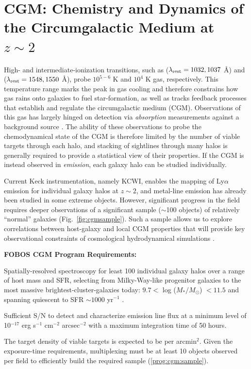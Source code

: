 \documentclass[11pt,a4paper,twoside,onecolumn,openany,final,oldfontcommands]{memoir}
\begin{document}


\section{CGM: Chemistry and Dynamics of the Circumgalactic Medium at $z\sim2$}

High- and intermediate-ionization transitions, such as  ($\lambda_{\rm rest} = 1032, 1037$ \AA) and  ($\lambda_{\rm rest} = 1548, 1550$ \AA), probe $10^{5-6}$ K and $10^4$ K gas, respectively.  This temperature range marks the peak in gas cooling and therefore constrains how gas rains onto galaxies to fuel star-formation, as well as tracks feedback processes that establish and regulate the circumgalactic medium (CGM).  Observations of this gas has largely hinged on detection via \textit{absorption} measurements against a background source .  The ability of these observations to probe the chemodynamical state of the CGM is therefore limited by the number of viable targets through each halo, and stacking of sightlines through many halos is generally required to provide a statistical view of their properties.  If the CGM is instead observed in \textit{emission}, each galaxy halo can be studied individually.

Current Keck instrumentation, namely KCWI, enables the mapping of Ly$\alpha$ emission for individual galaxy halos at $z\sim2$, and metal-line emission has already been studied in some extreme objects. However, significant progress in the field requires deeper observations of a significant sample ($\sim$100 objects) of relatively ``normal'' galaxies (Fig.~\ref{fig:cgmsample}).  Such a sample allows us to explore correlations between host-galaxy and local CGM properties that will provide key observational constraints of cosmological hydrodynamical simulations .


\noindent \textbf{FOBOS CGM Program Requirements:}

\begin{programrequirement}
\reqitem Spatially-resolved spectroscopy for least 100 individual galaxy halos over a range of host mass and SFR, selecting from Milky-Way-like progenitor galaxies to the most massive brightest-cluster-galaxies today: $9.7 <$ log ($M_*/M_\odot$) $< 11.5$ and spanning quiescent to SFR $\sim 1000$ yr$^{-1}$ . \label{prog:cgm:sample}

\reqitem Sufficient S/N to detect and characterize emission line flux at a minimum level of  10$^{-17}$ erg s$^{-1}$ cm$^{-2}$ arcsec$^{-2}$ with a maximum integration time of 50 hours.

\reqitem The target density of viable targets is expected to be  per arcmin$^2$.  Given the exposure-time requirements, multiplexing must be at least 10 objects observed per field to efficiently build the required sample (\ref{prog:cgm:sample}).
\end{programrequirement}
\end{document}
